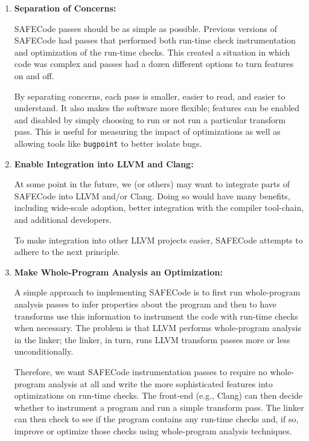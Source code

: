 \begin{enumerate}
\item{\textbf{Separation of Concerns:}}

SAFECode passes should be as simple as possible.  Previous versions of
SAFECode had passes that performed both run-time check instrumentation
and optimization of the run-time checks.  This created a situation in
which code was complex and passes had a dozen different options to
turn features on and off.

By separating concerns, each pass is smaller, easier to read, and
easier to understand.  It also makes the software more flexible;
features can be enabled and disabled by simply choosing to run or not
run a particular transform pass.  This is useful for measuring the
impact of optimizations as well as allowing tools like {\tt bugpoint}
to better isolate bugs.

\item{\textbf{Enable Integration into LLVM and Clang:}}

At some point in the future, we (or others) may want to integrate
parts of SAFECode into LLVM and/or Clang.  Doing so would have many
benefits, including wide-scale adoption, better integration with the
compiler tool-chain, and additional developers.

To make integration into other LLVM projects easier, SAFECode attempts
to adhere to the next principle.

\item{\textbf{Make Whole-Program Analysis an Optimization:}}

A simple approach to implementing SAFECode is to first run
whole-program analysis passes to infer properties about the program
and then to have transforms use this information to instrument the
code with run-time checks when necessary.  The problem is that LLVM
performs whole-program analysis in the linker; the linker, in turn,
runs LLVM transform passes more or less unconditionally.

Therefore, we want SAFECode instrumentation passes to require no
whole-program analysis at all and write the more sophisticated
features into optimizations on run-time checks.  The front-end (e.g.,
Clang) can then decide whether to instrument a program and run a
simple transform pass.  The linker can then check to see if the
program contains any run-time checks and, if so, improve or optimize
those checks using whole-program analysis techniques.
\end{enumerate}
 

